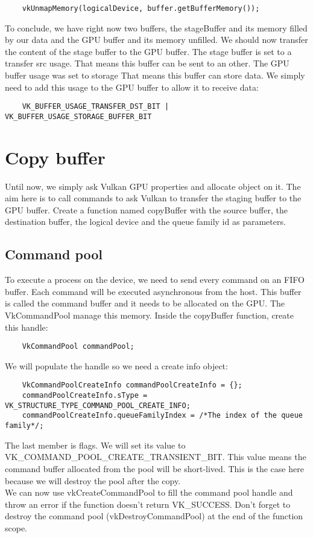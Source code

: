 \documentclass{article}
\begin{document}
\begin{lstlisting}
	vkUnmapMemory(logicalDevice, buffer.getBufferMemory());
\end{lstlisting}

To conclude, we have right now two buffers, the stageBuffer and its memory filled by our data and the GPU buffer and its memory unfilled. We should now transfer the content of the stage buffer to the GPU buffer. The stage buffer is set to a transfer src usage. That means this buffer can be sent to an other. The GPU buffer usage was set to storage That means this buffer can store data. We simply need to add this usage to the GPU buffer to allow it to receive data:
\begin{lstlisting}
	VK_BUFFER_USAGE_TRANSFER_DST_BIT | VK_BUFFER_USAGE_STORAGE_BUFFER_BIT 
\end{lstlisting}

\section{Copy buffer}
Until now, we simply ask Vulkan GPU properties and allocate object on it. The aim here is to call commands to ask Vulkan to transfer the staging buffer to the GPU buffer. Create a function named copyBuffer with the source buffer, the destination buffer, the logical device and the queue family id as parameters.
\subsection{Command pool}
To execute a process on the device, we need to send every command on an FIFO buffer. Each command will be executed asynchronous from the host. This buffer is called the command buffer and it needs to be allocated on the GPU. The VkCommandPool manage this memory. Inside the copyBuffer function, create this handle:
\begin{lstlisting}
	VkCommandPool commandPool;
\end{lstlisting}
We will populate the handle so we need a create info object:
\begin{lstlisting}
	VkCommandPoolCreateInfo commandPoolCreateInfo = {};
	commandPoolCreateInfo.sType = VK_STRUCTURE_TYPE_COMMAND_POOL_CREATE_INFO;
	commandPoolCreateInfo.queueFamilyIndex = /*The index of the queue family*/;
\end{lstlisting}
The last member is flags. We will set its value to VK\_COMMAND\_POOL\_CREATE\_TRANSIENT\_BIT. This value means the command buffer allocated from the pool will be short-lived. This is the case here because we will destroy the pool after the copy.\\
We can now use vkCreateCommandPool to fill the command pool handle and throw an error if the function doesn't return VK\_SUCCESS. Don't forget to destroy the command pool (vkDestroyCommandPool) at the end of the function scope.
\end{document}
